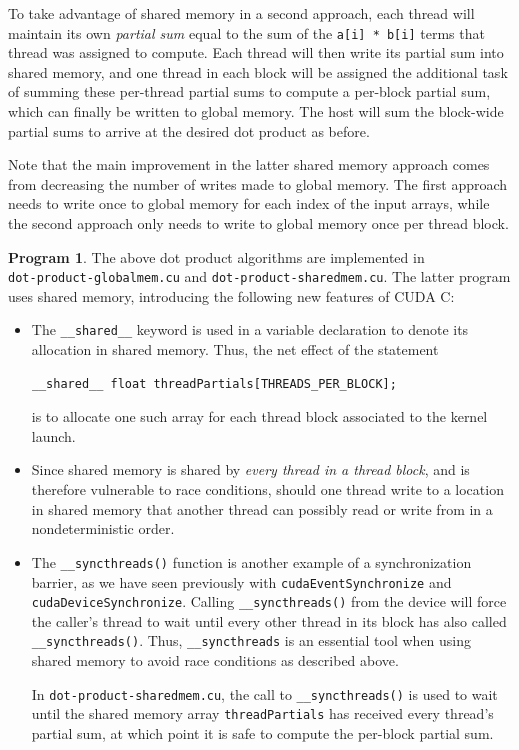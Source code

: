 \documentclass{article}
\theoremstyle{definition}
\newtheorem{program}{Program}
\begin{document}
To take advantage of shared memory in a second approach, each thread will maintain its own \emph{partial sum} equal to the sum of the \texttt{a[i] * b[i]} terms that thread was assigned to compute. Each thread will then write its partial sum into shared memory, and one thread in each block will be assigned the additional task of summing these per-thread partial sums to compute a per-block partial sum, which can finally be written to global memory. The host will sum the block-wide partial sums to arrive at the desired dot product as before. 

Note that the main improvement in the latter shared memory approach comes from decreasing the number of writes made to global memory. The first approach needs to write once to global memory for each index of the input arrays, while the second approach only needs to write to global memory once per thread block.

\begin{program}
The above dot product algorithms are implemented in\\ \texttt{dot-product-globalmem.cu} and \texttt{dot-product-sharedmem.cu}. The latter program uses shared memory, introducing the following new features of CUDA C:

\begin{itemize}
    \item The \texttt{\_\_shared\_\_} keyword is used in a variable declaration to denote its allocation in shared memory. Thus, the net effect of the statement
    \begin{verbatim}__shared__ float threadPartials[THREADS_PER_BLOCK];\end{verbatim}
    is to allocate one such array for each thread block associated to the kernel launch.
    
    \item Since shared memory is shared by \emph{every thread in a thread block}, and is therefore vulnerable to race conditions, should one thread write to a location in shared memory that another thread can possibly read or write from in a nondeterministic order.
    
    \item The \texttt{\_\_syncthreads()} function is another example of a synchronization barrier, as we have seen previously with \texttt{cudaEventSynchronize} and \\ \texttt{cudaDeviceSynchronize}. Calling \texttt{\_\_syncthreads()} from the device will force the caller's thread to wait until every other thread in its block has also called \texttt{\_\_syncthreads()}. Thus, \texttt{\_\_syncthreads} is an essential tool when using shared memory to avoid race conditions as described above.
    
    In \texttt{dot-product-sharedmem.cu}, the call to \texttt{\_\_syncthreads()} is used to wait until the shared memory array \texttt{threadPartials} has received every thread's partial sum, at which point it is safe to compute the per-block partial sum.
\end{itemize}
\end{program}
\end{document}
